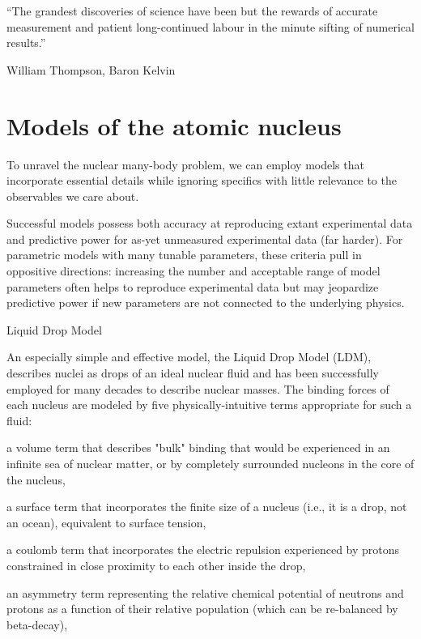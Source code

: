 
\epigraph{``The grandest discoveries of science have been but the rewards of
    accurate measurement and patient long-continued labour in the minute
sifting of numerical results.''}{William Thompson,  Baron Kelvin}

\section{Models of the atomic nucleus}

To unravel the nuclear many-body problem, we can
employ models that incorporate essential details while ignoring specifics with
little relevance to the observables we care about.

Successful models possess both accuracy at reproducing extant experimental data
and predictive power for as-yet unmeasured experimental data (far harder). For parametric models
with many tunable parameters, these criteria pull in oppositive directions: increasing the number
and acceptable range of model parameters often helps to reproduce experimental data but may
jeopardize predictive power if new parameters are not connected to the underlying physics.

Liquid Drop Model

An especially simple and
effective model, the Liquid Drop Model (LDM), describes nuclei as drops of
an ideal nuclear fluid and has been successfully employed for many decades to
describe nuclear masses. The binding forces of each nucleus are modeled by five
physically-intuitive terms appropriate for such a fluid:

a volume term that describes "bulk" binding that would be experienced in an
infinite sea of nuclear matter, or  by completely surrounded nucleons in the core of the nucleus,

a surface term that incorporates the finite size of a nucleus (i.e., it is a
drop, not an ocean), equivalent to surface tension,

a coulomb term that incorporates the electric repulsion experienced by protons
constrained in close proximity to each other inside the drop,

an asymmetry term representing the relative chemical potential of neutrons and
protons as a function of their relative population (which can be re-balanced by
beta-decay),

